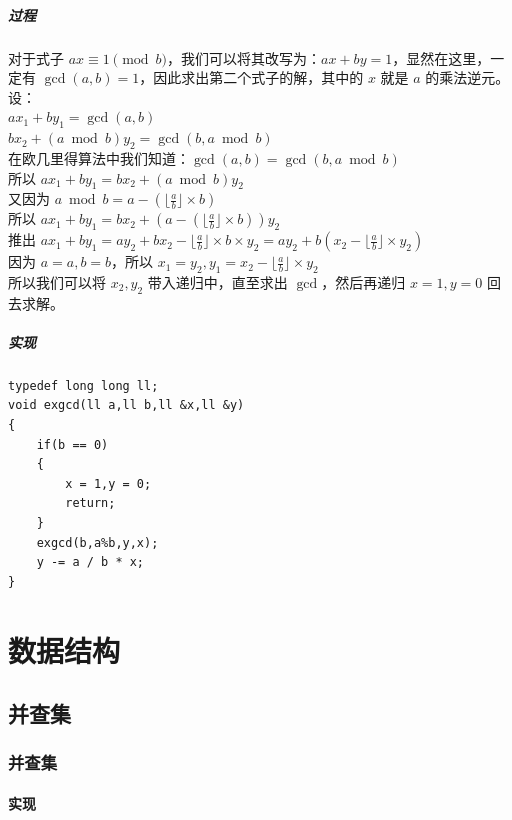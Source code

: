 \documentclass[10pt,twoside,a4paper,UTF8]{ctexbook}
\begin{document}
	\subsubsection{过程}
	\noindent
	对于式子 $ax \equiv 1 \pmod b$，我们可以将其改写为：$ax + by = 1$，显然在这里，一定有 $\gcd(a,b) = 1$，因此求出第二个式子的解，其中的 $x$ 就是 $a$ 的乘法逆元。\\
	设：\\
	$ax_1 + by_1 = \gcd(a,b)$\\
	$bx_2 + (a \bmod b)y_2 = \gcd(b,a \bmod b)$\\
	在欧几里得算法中我们知道：$\gcd(a,b) = \gcd(b,a\bmod b)$\\
	所以 $ax_1 + by_1 = bx_2 + (a \bmod b)y_2$\\
	又因为 $a \bmod b = a - (\lfloor\frac{a}{b}\rfloor\times b)$\\
	所以 $ax_1+by_1=bx_2+(a-(\lfloor\frac{a}{b}\rfloor\times b))y_2$\\
	推出 $ax_1+by_1=ay_2+bx_2-\lfloor\frac{a}{b}\rfloor\times b\times y_2=ay_2+b(x_2-\lfloor\frac{a}{b}\rfloor\times y_2)$\\
	因为 $a = a,b = b$，所以 $x_1=y_2,y_1=x_2-\lfloor\frac{a}{b}\rfloor\times y_2$\\
	所以我们可以将 $x_2,y_2$ 带入递归中，直至求出 $\gcd$，然后再递归 $x=1,y=0$ 回去求解。\\
	\subsubsection{实现}
	\begin{lstlisting}
typedef long long ll;
void exgcd(ll a,ll b,ll &x,ll &y)
{ 
	if(b == 0)
	{
		x = 1,y = 0;
		return;
	}
	exgcd(b,a%b,y,x);
	y -= a / b * x;
}
	\end{lstlisting}
	
	\part{数据结构}
	\chapter{并查集}
	\section{并查集}
	\subsection{实现}
\end{document}
